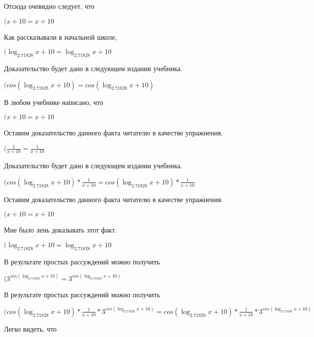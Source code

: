 \documentclass[12pt,a4paper,fleqn]{article}
\theoremstyle{definition}
\begin{document}
Отсюда очевидно следует, что

$( x  +  10  =  x  +  10 $

Как рассказывали в начальной школе,

$(\log_{ 2.71828 }{ x  +  10 } = \log_{ 2.71828 }{ x  +  10 }$

Доказательство будет дано в следующем издании учебника.

$(cos(\log_{ 2.71828 }{ x  +  10 }) = cos(\log_{ 2.71828 }{ x  +  10 })$

В любом учебнике написано, что

$( x  +  10  =  x  +  10 $

Оставим доказательство данного факта читателю в качестве упражнения.

$(\frac{ 1 }{ x  +  10 }
 = \frac{ 1 }{ x  +  10 }
$

Доказательство будет дано в следующем издании учебника.

$(cos(\log_{ 2.71828 }{ x  +  10 }) * \frac{ 1 }{ x  +  10 }
 = cos(\log_{ 2.71828 }{ x  +  10 }) * \frac{ 1 }{ x  +  10 }
$

Оставим доказательство данного факта читателю в качестве упражнения.

$( x  +  10  =  x  +  10 $

Мне было лень доказывать этот факт.

$(\log_{ 2.71828 }{ x  +  10 } = \log_{ 2.71828 }{ x  +  10 }$

В результате простых рассуждений можно получить

$({ 3 }^{sin(\log_{ 2.71828 }{ x  +  10 })} = { 3 }^{sin(\log_{ 2.71828 }{ x  +  10 })}$

В результате простых рассуждений можно получить

$(cos(\log_{ 2.71828 }{ x  +  10 }) * \frac{ 1 }{ x  +  10 }
 * { 3 }^{sin(\log_{ 2.71828 }{ x  +  10 })} = cos(\log_{ 2.71828 }{ x  +  10 }) * \frac{ 1 }{ x  +  10 }
 * { 3 }^{sin(\log_{ 2.71828 }{ x  +  10 })}$

Легко видеть, что
\end{document}
